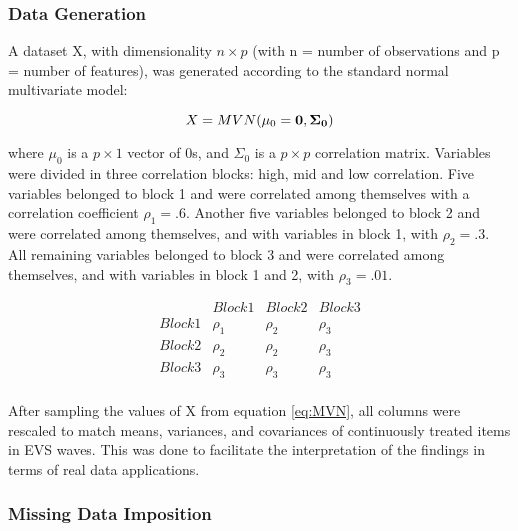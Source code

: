 \subsubsection{Data Generation}

A dataset X, with dimensionality $n \times p$ (with n = number of observations and p = number of features),
was generated according to the standard normal multivariate model:

\begin{equation}
	X = MVN(\mu_0 = \bf{0}, \Sigma_0) \label{eq:MVN}
\end{equation}

where $\mu_0$ is a $p \times 1$ vector of 0s, and $\Sigma_0$ is a $p \times p$ correlation matrix. Variables were divided in 
three correlation blocks: high, mid and low correlation. Five variables belonged to block 1 and were correlated among themselves with 
a correlation coefficient $\rho_1 = .6$. Another five variables belonged to block 2 and were correlated among themselves, and with variables in 
block 1, with $\rho_2 = .3$. All remaining variables belonged to block 3 and were correlated among themselves, and with variables in 
block 1 and 2, with $\rho_3 = .01$. 

$$
\begin{matrix}
		& Block 1 	& Block 2	& Block 3	\\
	Block 1	& \rho_1	& \rho_2 	& \rho_3 	\\
	Block 2 & \rho_2	& \rho_2	& \rho_3 	\\
	Block 3	& \rho_3 	& \rho_3	& \rho_3 	\\
\end{matrix}
$$

After sampling the values of X from equation \ref{eq:MVN}, all columns were rescaled to match means, variances, and 
covariances of continuously treated items in EVS waves. This was done to facilitate the interpretation of the findings
in terms of real data applications. 

\iffalse %
Looking at 10 points EVS items on democratic beliefs and moral values in the 2017 
EVS wave, we noticed that on average these items have means and variances around 5. Hence, each variable in X was centred 
around 5 (instead of 0) and scaled to have variance around 5 (instead of 1). As a result the covariances between variables
were also rescaled to match EVS data: correlations of .6 and .3 translated to covariances of 3 and 1.5 respectively.
\fi

\subsubsection{Missing Data Imposition}

